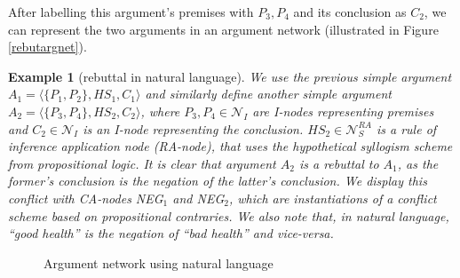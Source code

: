 \documentclass[12pt, a4paper]{article}
\newtheorem{Ex}{Example}[subsection]
\begin{document}
After labelling this argument's premises with $P_3, P_4$ and its conclusion as $C_2$, we can represent the two arguments in an argument network (illustrated in Figure \ref{rebutargnet}).
\begin{Ex}[rebuttal in natural language]
\sloppy We use the previous simple argument $A_1 = \langle \lbrace P_1, P_2 \rbrace, HS_1, C_1\rangle$ and similarly define another simple argument $A_2 = \langle \lbrace P_3, P_4 \rbrace, HS_2, C_2\rangle$, where $P_3, P_4 \in \mathcal{N}_I$ are I-nodes representing premises and $C_2 \in \mathcal{N}_I$ is an I-node representing the conclusion. $HS_2 \in \mathcal{N}_S^{RA}$ is a rule of inference application node (RA-node), that uses the hypothetical syllogism scheme from propositional logic. It is clear that argument $A_2$ is a rebuttal to $A_1$, as the former's conclusion is the negation of the latter's conclusion. We display this conflict with CA-nodes NEG$_1$ and NEG$_2$, which are instantiations of a conflict scheme based on propositional contraries. We also note that, in natural language, ``good health'' is the negation of ``bad health'' and vice-versa.
\end{Ex}

\begin{figure}
\centering
{}
\caption{Argument network using natural language} \label{argnet}
\end{figure}
\end{document}

